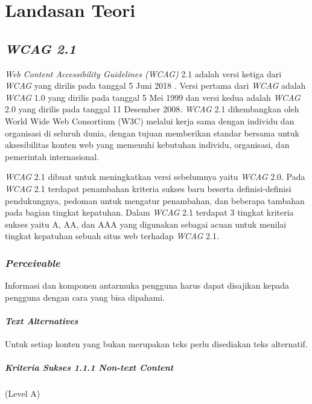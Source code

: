 \setcounter{secnumdepth}{3}

\chapter{Landasan Teori}
\label{chap:teori}

\section{\textit{WCAG 2.1}}
\label{sec:wcag_2.1} 
\textit{Web Content Accessibility Guidelines (WCAG)} 2.1 adalah versi ketiga dari \textit{WCAG} yang dirilis pada tanggal 5 Juni 2018 \cite{WCAG:2.1}. Versi pertama dari \textit{WCAG} adalah \textit{WCAG} 1.0 yang dirilis pada tanggal 5 Mei 1999 dan versi kedua adalah \textit{WCAG} 2.0 yang dirilis pada tanggal 11 Desember 2008. \textit{WCAG} 2.1 dikembangkan oleh World Wide Web Consortium (W3C) melalui kerja sama dengan individu dan organisasi di seluruh dunia, dengan tujuan memberikan standar bersama untuk aksesibilitas konten web yang memenuhi kebutuhan individu, organisasi, dan pemerintah internasional. 

\textit{WCAG} 2.1 dibuat untuk meningkatkan versi sebelumnya yaitu \textit{WCAG} 2.0. Pada \textit{WCAG} 2.1 terdapat penambahan kriteria sukses baru beserta definisi-definisi pendukungnya, pedoman untuk mengatur penambahan, dan beberapa tambahan pada bagian tingkat kepatuhan. Dalam \textit{WCAG} 2.1 terdapat 3 tingkat kriteria sukses yaitu A, AA, dan AAA yang digunakan sebagai acuan untuk menilai tingkat kepatuhan sebuah situs web terhadap \textit{WCAG} 2.1.

\subsection{\textit{Perceivable}}
\label{sec:perceivable}
Informasi dan komponen antarmuka pengguna harus dapat disajikan kepada pengguna dengan cara yang bisa dipahami.

\subsubsection{\textit{Text Alternatives}}
\label{sec:text_alternatives}
Untuk setiap konten yang bukan merupakan teks perlu disediakan teks alternatif.

\paragraph{Kriteria Sukses 1.1.1 \textit{Non-text Content}}
\label{sec:kriteria_sukses_1.1.1}
(Level A)\\

